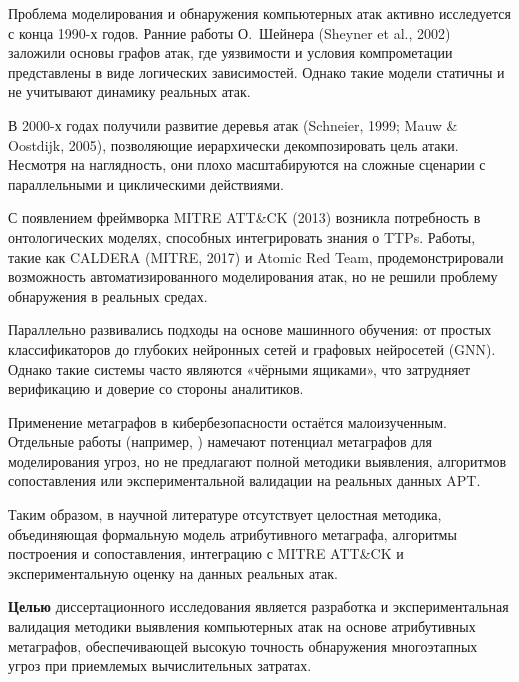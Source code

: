 Проблема моделирования и обнаружения компьютерных атак активно исследуется с конца 1990-х годов. Ранние работы О.~Шейнера (Sheyner et al., 2002) заложили основы графов атак, где уязвимости и условия компрометации представлены в виде логических зависимостей. Однако такие модели статичны и не учитывают динамику реальных атак.

В 2000-х годах получили развитие деревья атак (Schneier, 1999; Mauw \& Oostdijk, 2005), позволяющие иерархически декомпозировать цель атаки. Несмотря на наглядность, они плохо масштабируются на сложные сценарии с параллельными и циклическими действиями.

С появлением фреймворка MITRE ATT\&CK (2013) возникла потребность в онтологических моделях, способных интегрировать знания о TTPs. Работы, такие как CALDERA (MITRE, 2017) и Atomic Red Team, продемонстрировали возможность автоматизированного моделирования атак, но не решили проблему обнаружения в реальных средах.

Параллельно развивались подходы на основе машинного обучения: от простых классификаторов до глубоких нейронных сетей и графовых нейросетей (GNN). Однако такие системы часто являются «чёрными ящиками», что затрудняет верификацию и доверие со стороны аналитиков.

Применение метаграфов в кибербезопасности остаётся малоизученным. Отдельные работы (например, \cite{Latypov2020}) намечают потенциал метаграфов для моделирования угроз, но не предлагают полной методики выявления, алгоритмов сопоставления или экспериментальной валидации на реальных данных APT.

Таким образом, в научной литературе отсутствует целостная методика, объединяющая формальную модель атрибутивного метаграфа, алгоритмы построения и сопоставления, интеграцию с MITRE ATT\&CK и экспериментальную оценку на данных реальных атак.

\textbf{Целью} диссертационного исследования является разработка и экспериментальная валидация методики выявления компьютерных атак на основе атрибутивных метаграфов, обеспечивающей высокую точность обнаружения многоэтапных угроз при приемлемых вычислительных затратах.

